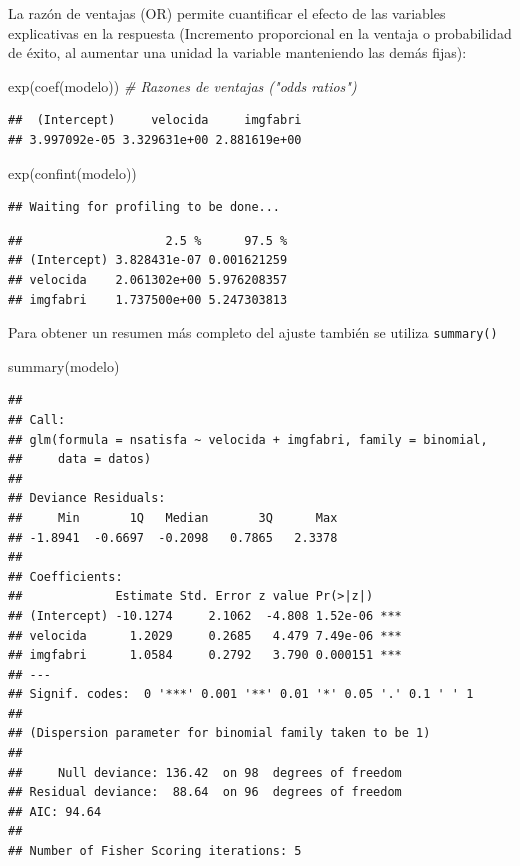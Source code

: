 \documentclass[
]{book}
\newenvironment{Shaded}{\begin{snugshade}}{\end{snugshade}}
\newcommand{\CommentTok}[1]{\textcolor[rgb]{0.56,0.35,0.01}{\textit{#1}}}
\newcommand{\FunctionTok}[1]{\textcolor[rgb]{0.00,0.00,0.00}{#1}}
\newcommand{\NormalTok}[1]{#1}
\theoremstyle{break}
\begin{document}
La razón de ventajas (OR) permite cuantificar el efecto de las variables explicativas en la respuesta
(Incremento proporcional en la ventaja o probabilidad de éxito, al aumentar una unidad la variable manteniendo las demás fijas):

\begin{Shaded}
\begin{Highlighting}[]
\FunctionTok{exp}\NormalTok{(}\FunctionTok{coef}\NormalTok{(modelo))  }\CommentTok{\# Razones de ventajas ("odds ratios")}
\end{Highlighting}
\end{Shaded}

\begin{verbatim}
##  (Intercept)     velocida     imgfabri 
## 3.997092e-05 3.329631e+00 2.881619e+00
\end{verbatim}

\begin{Shaded}
\begin{Highlighting}[]
\FunctionTok{exp}\NormalTok{(}\FunctionTok{confint}\NormalTok{(modelo))}
\end{Highlighting}
\end{Shaded}

\begin{verbatim}
## Waiting for profiling to be done...
\end{verbatim}

\begin{verbatim}
##                    2.5 %      97.5 %
## (Intercept) 3.828431e-07 0.001621259
## velocida    2.061302e+00 5.976208357
## imgfabri    1.737500e+00 5.247303813
\end{verbatim}

Para obtener un resumen más completo del ajuste también se utiliza \texttt{summary()}

\begin{Shaded}
\begin{Highlighting}[]
\FunctionTok{summary}\NormalTok{(modelo)}
\end{Highlighting}
\end{Shaded}

\begin{verbatim}
## 
## Call:
## glm(formula = nsatisfa ~ velocida + imgfabri, family = binomial, 
##     data = datos)
## 
## Deviance Residuals: 
##     Min       1Q   Median       3Q      Max  
## -1.8941  -0.6697  -0.2098   0.7865   2.3378  
## 
## Coefficients:
##             Estimate Std. Error z value Pr(>|z|)    
## (Intercept) -10.1274     2.1062  -4.808 1.52e-06 ***
## velocida      1.2029     0.2685   4.479 7.49e-06 ***
## imgfabri      1.0584     0.2792   3.790 0.000151 ***
## ---
## Signif. codes:  0 '***' 0.001 '**' 0.01 '*' 0.05 '.' 0.1 ' ' 1
## 
## (Dispersion parameter for binomial family taken to be 1)
## 
##     Null deviance: 136.42  on 98  degrees of freedom
## Residual deviance:  88.64  on 96  degrees of freedom
## AIC: 94.64
## 
## Number of Fisher Scoring iterations: 5
\end{verbatim}
\end{document}
